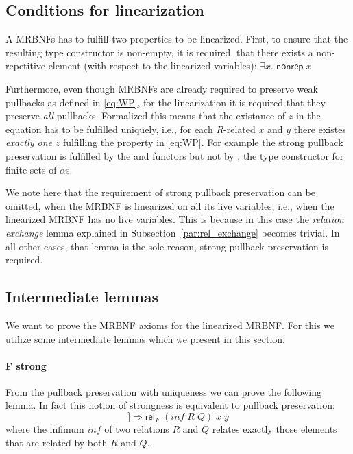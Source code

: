     
  \subsection{Conditions for linearization}
  \label{subsec:conditions}
    A \acp{MRBNF} has to fulfill two properties to be linearized. First, to ensure that the resulting type constructor is non-empty, it is required, that there exists a non-repetitive element (with respect to the linearized variables): $\exists x.\; \textsf{nonrep}\; x$

    Furthermore, even though \acp{MRBNF} are already required to preserve weak pullbacks as defined in \autoref{eq:WP}, for the linearization it is required that they preserve \textit{all} pullbacks. Formalized this means that the existance of $z$ in the equation has to be fulfilled uniquely, i.e., for each $R$-related $x$ and $y$ there existes \textit{exactly one} $z$ fulfilling the property in \autoref{eq:WP}. For example the strong pullback preservation is fulfilled by the  and  functors but not by , the type constructor for finite sets of $\alpha$s. 

    We note here that the requirement of strong pullback preservation can be omitted, when the \ac{MRBNF} is linearized on all its live variables, i.e., when the linearized \ac{MRBNF} has no live variables. This is because in this case the \textit{relation exchange} lemma explained in Subsection~\ref{par:rel_exchange} becomes trivial. In all other cases, that lemma is the sole reason, strong pullback preservation is required.

  \subsection{Intermediate lemmas}
    We want to prove the \ac{MRBNF} axioms for the linearized \ac{MRBNF}. For this we utilize some intermediate lemmas which we present in this section.
    
    \paragraph{F strong}
      From the pullback preservation with uniqueness we can prove the following lemma. In fact this notion of strongness is equivalent to pullback preservation: 
      \begin{equation*}
        [\![\textsf{rel}_F\; R\; x\; y;\; \textsf{rel}_F\; Q\; x\; y]\!] \Longrightarrow \textsf{rel}_F\; (inf\; R\; Q)\; x\; y
      \end{equation*} 
      where the infimum $inf$ of two relations $R$ and $Q$ relates exactly those elements that are related by both $R$ and $Q$.

